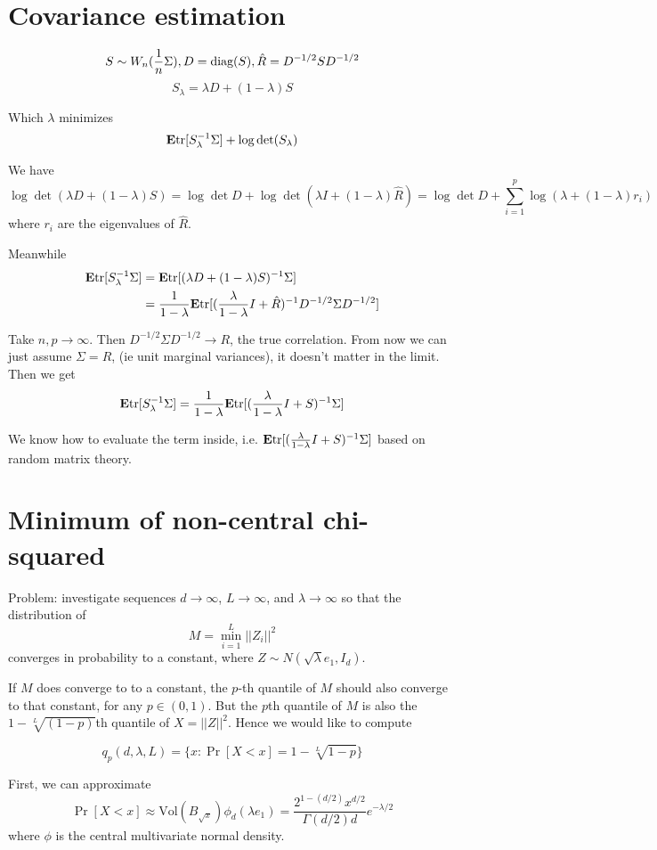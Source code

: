 \documentclass[12pt]{article}
\begin{document}
\section{Covariance estimation}

\[
S \sim W_n(\frac{1}{n}\Sigma), D = \text{diag}(S), \hat{R} = D^{-1/2}S D^{-1/2}
\]
\[
S_\lambda = \lambda D + (1-\lambda)S
\]

Which $\lambda$ minimizes
\[
\textbf{E} \text{tr}[S_\lambda^{-1} \Sigma] + \log\det(S_\lambda)
\]

We have
\[
\log\det(\lambda D + (1-\lambda)S) = \log\det D + \log\det(\lambda I + (1-\lambda)\hat{R}) = \log\det D + \sum_{i=1}^p \log (\lambda + (1-\lambda) r_i)
\]
where $r_i$ are the eigenvalues of $\hat{R}$.

Meanwhile
\begin{align*}
\textbf{E} \text{tr}[S_\lambda^{-1} \Sigma] &=
\textbf{E} \text{tr}[(\lambda D + (1-\lambda)S)^{-1}\Sigma]
\\&= 
\frac{1}{1-\lambda} \textbf{E} \text{tr}[(\frac{\lambda}{1-\lambda}I +\hat{R})^{-1}D^{-1/2}\Sigma D^{-1/2}]
\end{align*}

Take $n, p \to \infty$.  Then $D^{-1/2}\Sigma D^{-1/2} \to R$, the true correlation.  From now we can just assume $\Sigma=R$, (ie unit marginal variances), it doesn't matter in the limit.  Then we get
\[
\textbf{E} \text{tr}[S_\lambda^{-1} \Sigma] = \frac{1}{1-\lambda} \textbf{E} \text{tr}[(\frac{\lambda}{1-\lambda}I + S)^{-1} \Sigma]
\]

We know how to evaluate the term inside, i.e. $\textbf{E} \text{tr}[(\frac{\lambda}{1-\lambda}I + S)^{-1} \Sigma]$ based on random matrix theory.

\section{Minimum of non-central chi-squared}

Problem: investigate sequences $d \to \infty$, $L \to \infty$, and $\lambda \to \infty$ so that the distribution of
\[
M = \min_{i=1}^L ||Z_i||^2
\]
converges in probability to a constant,
where $Z \sim N(\sqrt{\lambda}e_1, I_d)$.

If $M$ does converge to to a constant, the $p$-th quantile of $M$
should also converge to that constant, for any $p \in (0, 1)$.  But
the $p$th quantile of $M$ is also the $1 - \sqrt[L]{(1-p)}$th quantile
of $X = ||Z||^2$.  Hence we would like to compute

\[
q_p(d, \lambda, L) = \{x : \Pr[X < x] = 1-\sqrt[L]{1-p}\}
\]

First, we can approximate
\[
\Pr[X < x] \approx \text{Vol}(B_{\sqrt{x}}) \phi_d(\lambda e_1) = \frac{2^{1-(d/2)} x^{d/2}}{\Gamma(d/2) d} e^{-\lambda/2}
\]
where $\phi$ is the central multivariate normal density.
\end{document}
